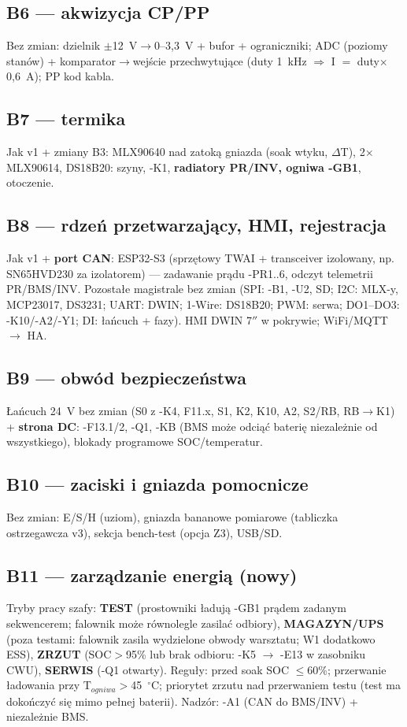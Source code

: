 \documentclass[11pt,a4paper]{article}
\begin{document}
\subsection{B6 --- akwizycja CP/PP}
Bez zmian: dzielnik $\pm$12~V$\to$0--3,3~V + bufor + ograniczniki; ADC (poziomy stanów) +
komparator$\to$wejście przechwytujące (duty 1~kHz $\Rightarrow$ I $=$ duty$\times$0,6~A); PP kod kabla.
\subsection{B7 --- termika}
Jak v1 + zmiany B3: MLX90640 nad zatoką gniazda (soak wtyku, $\Delta$T), 2$\times$ MLX90614,
DS18B20: szyny, -K1, \textbf{radiatory PR/INV, ogniwa -GB1}, otoczenie.
\subsection{B8 --- rdzeń przetwarzający, HMI, rejestracja}
Jak v1 + \textbf{port CAN}: ESP32-S3 (sprzętowy TWAI + transceiver izolowany, np. SN65HVD230
za izolatorem) --- zadawanie prądu -PR1..6, odczyt telemetrii PR/BMS/INV. Pozostałe magistrale
bez zmian (SPI: -B1, -U2, SD; I2C: MLX-y, MCP23017, DS3231; UART: DWIN; 1-Wire: DS18B20;
PWM: serwa; DO1--DO3: -K10/-A2/-Y1; DI: łańcuch + fazy). HMI DWIN 7$''$ w pokrywie; WiFi/MQTT $\to$ HA.
\subsection{B9 --- obwód bezpieczeństwa}
Łańcuch 24~V bez zmian (S0 z -K4, F11.x, S1, K2, K10, A2, S2/RB, RB$\to$K1) + \textbf{strona DC}:
-F13.1/2, -Q1, -KB (BMS może odciąć baterię niezależnie od wszystkiego), blokady programowe SOC/temperatur.
\subsection{B10 --- zaciski i gniazda pomocnicze}
Bez zmian: E/S/H (uziom), gniazda bananowe pomiarowe (tabliczka ostrzegawcza v3), sekcja bench-test
(opcja Z3), USB/SD.
\subsection{B11 --- zarządzanie energią (nowy)}
\label{sec:b11}
Tryby pracy szafy: \textbf{TEST} (prostowniki ładują -GB1 prądem zadanym sekwencerem; falownik
może równolegle zasilać odbiory), \textbf{MAGAZYN/UPS} (poza testami: falownik zasila wydzielone
obwody warsztatu; W1 dodatkowo ESS), \textbf{ZRZUT} (SOC$>$95\% lub brak odbioru: -K5 $\to$ -E13
w zasobniku CWU), \textbf{SERWIS} (-Q1 otwarty). Reguły: przed soak SOC $\le$60\%; przerwanie
ładowania przy T$_{ogniwa}>$45~$^\circ$C; priorytet zrzutu nad przerwaniem testu (test ma dokończyć
się mimo pełnej baterii). Nadzór: -A1 (CAN do BMS/INV) + niezależnie BMS.
\end{document}
